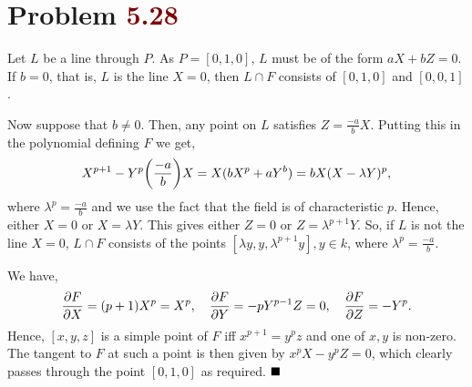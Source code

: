 \documentclass[12pt]{article}
\begin{document}
\section*{Problem \textcolor{maroon}{5.28}}

Let \( L \) be a line through \( P \). As \( P = [0,1,0] \), \( L \) must be of the form \( aX+bZ=0 \). If \( b = 0 \), that is, \( L \) is the line \( X = 0 \), then \( L \cap F \) consists of \( [0,1,0] \) and \( [0,0,1] \).
\smallskip

Now suppose that \( b \neq 0 \). Then, any point on \( L \) satisfies \( Z = \frac{-a}{b}X \). Putting this in the polynomial defining \( F \) we get,
\[
   X^{p+1}-Y^p \qty(\frac{-a}{b}) X = X(bX^p+aY^b) = bX (X-\lambda Y)^p,
\]
where \( \lambda^p = \frac{-a}{b} \) and we use the fact that the field is of characteristic \( p \). Hence, either \( X = 0 \) or \( X = \lambda Y \). This gives either \( Z = 0 \) or \( Z = \lambda^{p+1}Y \). So, if \( L \) is not the line \( X = 0 \), \( L \cap F \) consists of the points \( [\lambda y, y, \lambda^{p+1} y], y \in k \), where \( \lambda^p = \frac{-a}{b} \).
\smallskip

We have,
\[
   \pdv{F}{X} = (p+1)X^p = X^p, \quad \pdv{F}{Y} = -pY^{p-1}Z = 0, \quad \pdv{F}{Z} = -Y^p.
\]
Hence, \( [x,y,z] \) is a simple point of \( F \) iff \( x^{p+1} = y^pz \) and one of \( x,y \) is non-zero. The tangent to \( F \) at such a point is then given by \( x^p X -y^p Z = 0 \), which clearly passes through the point \( [0,1,0] \) as required. \(\hfill \blacksquare\)
\end{document}
